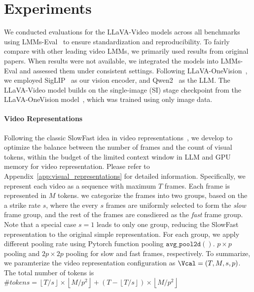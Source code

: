 \section{Experiments}
We conducted evaluations for the LLaVA-Video models across all benchmarks using LMMs-Eval~\citep{zhang2024lmms} to ensure standardization and reproducibility. To fairly compare with other leading video LMMs, we primarily used results from original papers. When results were not available, we integrated the models into LMMs-Eval and assessed them under consistent settings. Following LLaVA-OneVision~\citep{li2024llavaonevision}, we employed SigLIP~\citep{zhai2023sigmoid} as our vision encoder, and Qwen2~\citep{yang2024qwen2} as the LLM. The LLaVA-Video model builds on the single-image (SI) stage checkpoint from the LLaVA-OneVision model~\citep{li2024llavaonevision}, which was trained using only image data. 

\paragraph{Video Representations}
Following the classic SlowFast idea in video representations~\citep{feichtenhofer2019slowfast,xu2024slowfast,huang2024lita}, we develop \textit{\MethodName{}} to optimize the balance between the number of frames and the count of visual tokens, within the budget of the limited context window in LLM and GPU memory for video representation. Please refer to Appendix~\ref{app:visual_representations} for detailed information. Specifically, we represent each video as a sequence with maximum $T$ frames. Each frame is represented in $M$ tokens. we categorize the frames into two groups, based on the a strike rate $s$, where the every $s$ frames are uniformly selected to form the \textit{slow} frame group, and the rest of the frames are consdiered as the \textit{fast} frame group. Note that a special case $s=1$ leads to only one group, reducing the SlowFast representation to the original simple representation. For each group, we apply different pooling rate using Pytorch function pooling $\mathtt{avg\_pool2d}()$.  $p \times p$ pooling and $2p \times 2p$ pooling for slow and fast frames, respectively. To summarize, we paramterize the video representation configuration as $\Vcal = (T, M, s, p)$. The total number of tokens is \(
\#tokens = \left\lfloor T/s \right\rfloor \times \left\lfloor M/p^2 \right\rfloor + \left( T - \left\lfloor T/s \right\rfloor \right) \times \left\lfloor M/p^2 \right\rfloor
\)

